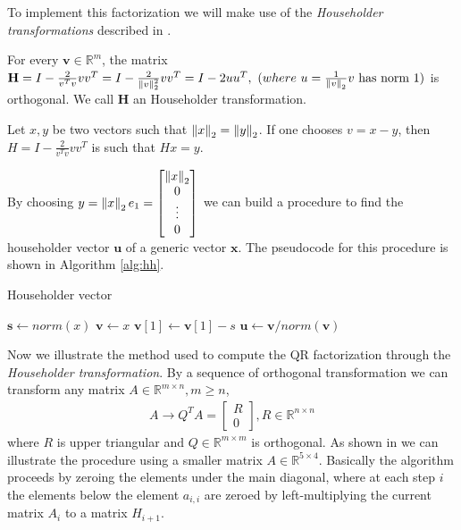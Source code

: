 To implement this factorization we will make use of the \textit{Householder transformations} described in \parencite[Chap. 4.2.2]{elden}.

\begin{lemma}
For every $\mathbf{v}\in \mathbb{R}^m$, the matrix $\mathbf{H} = I - \frac{2}{v^Tv}vv^T = I - \frac{2}{\left\lVert v \right\rVert_2^2}vv^T
 = I - 2uu^T,\ (where\ u=\frac{1}{\left\lVert v \right\rVert_2}v\text{ has norm 1})$ is orthogonal. We call $\mathbf{H}$ an Householder transformation.
\end{lemma}
\begin{lemma}
Let $x, y$ be two vectors such that $\left\lVert x \right\rVert_2 = \left\lVert y \right\rVert_2$. If one chooses $v=x-y$, then $H = I - \frac{2}{v^Tv}vv^T$ is such that $Hx = y$.
\end{lemma}
By choosing $y = \left\lVert x \right\rVert_2e_1 = \begin{bmatrix}\left\lVert x \right\rVert_2\\0\\ \vdots \\0\end{bmatrix}$ we can build a procedure to find the householder vector $\textbf{u}$ of a generic vector $\textbf{x}$. The pseudocode for this procedure is shown in Algorithm \ref{alg:hh}.
\begin{algorithm}[H]
	\caption{Householder vector}
	\label{alg:hh}
	\begin{algorithmic}[1]
		\State $\mathbf{s} \leftarrow norm(x)$
		\State $\mathbf{v} \leftarrow x$
		\State $\mathbf{v}[1] \leftarrow \mathbf{v}[1] - s$
		\State $\mathbf{u} \leftarrow \mathbf{v} / norm(\mathbf{v})$
		\EndFunction
	\end{algorithmic}
\end{algorithm}
Now we illustrate the method used to compute the QR factorization through the \textit{Householder transformation}. By a sequence of orthogonal transformation we can transform any matrix $A\in \mathbb{R}^{m\times n}, m\geq n$,
\begin{align*}
    A \to Q^TA = \begin{bmatrix}R \\ 0\end{bmatrix}, R \in \mathbb{R}^{n\times n}
\end{align*}
where $R$ is upper triangular and $Q\in \mathbb{R}^{m\times m}$ is orthogonal. As shown in \parencite[Chap. 5.1]{elden} we can illustrate the procedure using a smaller matrix $A\in \mathbb{R}^{5\times 4}$. Basically the algorithm proceeds by zeroing the elements under the main diagonal, where at each step $i$ the elements below the element $a_{i,i}$ are zeroed by left-multiplying the current matrix $A_i$ to a matrix $H_{i+1}$.

